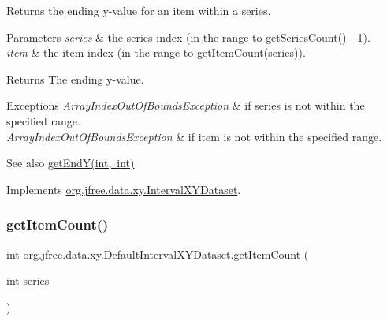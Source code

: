 Returns the ending y-\/value for an item within a series.


\begin{DoxyParams}{Parameters}
{\em series} & the series index (in the range {} to {\ttfamily \mbox{\hyperlink{classorg_1_1jfree_1_1data_1_1xy_1_1_default_interval_x_y_dataset_a11470bfa9b540c971123d4282c0f5a8a}{get\+Series\+Count()}} -\/ 1}). \\
\hline
{\em item} & the item index (in the range {} to {\ttfamily get\+Item\+Count(series)}).\\
\hline
\end{DoxyParams}
\begin{DoxyReturn}{Returns}
The ending y-\/value.
\end{DoxyReturn}

\begin{DoxyExceptions}{Exceptions}
{\em Array\+Index\+Out\+Of\+Bounds\+Exception} & if {\ttfamily series} is not within the specified range. \\
\hline
{\em Array\+Index\+Out\+Of\+Bounds\+Exception} & if {\ttfamily item} is not within the specified range.\\
\hline
\end{DoxyExceptions}
\begin{DoxySeeAlso}{See also}
\mbox{\hyperlink{classorg_1_1jfree_1_1data_1_1xy_1_1_default_interval_x_y_dataset_aed7774df9c641523b66b02e176b813ed}{get\+End\+Y(int, int)}} 
\end{DoxySeeAlso}


Implements \mbox{\hyperlink{interfaceorg_1_1jfree_1_1data_1_1xy_1_1_interval_x_y_dataset_a0538ada774aad34ec95edbb84c1a82e1}{org.\+jfree.\+data.\+xy.\+Interval\+X\+Y\+Dataset}}.

\mbox{\label{classorg_1_1jfree_1_1data_1_1xy_1_1_default_interval_x_y_dataset_a902acf0c4bef6282326f87be5a8e0f10}} 
\subsubsection{\texorpdfstring{get\+Item\+Count()}{getItemCount()}}
{\footnotesize\ttfamily int org.\+jfree.\+data.\+xy.\+Default\+Interval\+X\+Y\+Dataset.\+get\+Item\+Count (\begin{DoxyParamCaption}\item[{int}]{series }\end{DoxyParamCaption})}

